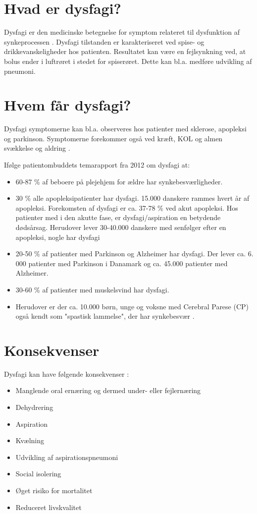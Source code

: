 \documentclass[main.tex]{subfiles}
\begin{document}
\section*{Hvad er dysfagi?}
Dysfagi er den medicinske betegnelse for symptom relateret til dysfunktion af synkeprocessen \cite{KjaersgaardPh.d.studerendeDYSFAGIKonsekvenser}. Dysfagi tilstanden er karakteriseret ved spise- og drikkevanskeligheder hos patienten. Resultatet kan være en fejlsynkning ved, at bolus ender i luftrøret i stedet for spiserøret. Dette kan bl.a. medføre udvikling af pneumoni.
\section*{Hvem får dysfagi?}

 Dysfagi symptomerne kan bl.a. observeres hos patienter med sklerose, apopleksi og parkinson.   Symptomerne forekommer også ved kræft, KOL og almen svækkelse og aldring \cite{SallyRefsgaardTinesterbyKristensen2015DysfagiKommune}. 

Ifølge patientombuddets temarapport fra 2012 om dysfagi at:

\begin{itemize}
\item 60-87 \% af beboere på plejehjem for ældre har synkebesværligheder.
\item 30 \% alle apopleksipatienter har dysfagi. 15.000 danskere rammes hvert år af apopleksi. Forekomsten af dysfagi er ca. 37-78 \% ved akut apopleksi. Hos patienter med i den akutte fase, er dysfagi/aspiration en betydende dødsårsag. Herudover lever 30-40.000 danskere med senfølger efter en apopleksi, nogle har dysfagi
\item 20-50 \% af patienter med Parkinson og Alzheimer har dysfagi. Der lever ca. 6. 000 patienter med Parkinson i Danamark og ca. 45.000 patienter med Alzheimer.  
\item 30-60 \% af patienter med muskelsvind har dysfagi.
\item Herudover er der ca. 10.000 børn, unge og voksne med Cerebral Parese (CP) også kendt som "spastisk lammelse", der har synkebesvær \cite{Bommersholdt2012TemarapportDysfagi}. 
\end{itemize}

\section*{Konsekvenser}
Dysfagi kan have følgende konsekvenser \cite[s. 12]{KjaersgaardPh.d.studerendeDYSFAGIKonsekvenser}:
\begin{itemize}
\item Manglende oral ernæring og dermed under- eller fejlernæring
\item Dehydrering
\item Aspiration
\item Kvælning
\item Udvikling af aspirationspneumoni
\item Social isolering
\item Øget risiko for mortalitet
\item Reduceret livskvalitet

\end{itemize}
\end{document}
